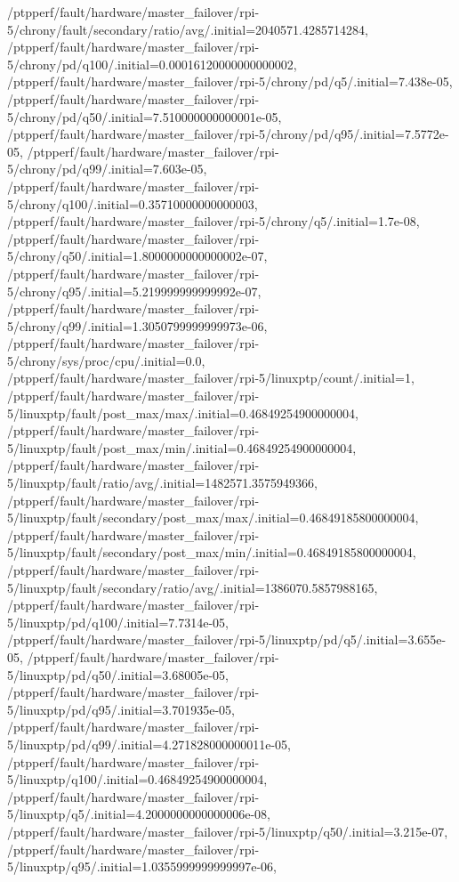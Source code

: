 {    /ptpperf/fault/hardware/master_failover/rpi-5/chrony/fault/secondary/ratio/avg/.initial=2040571.4285714284,
    /ptpperf/fault/hardware/master_failover/rpi-5/chrony/pd/q100/.initial=0.00016120000000000002,
    /ptpperf/fault/hardware/master_failover/rpi-5/chrony/pd/q5/.initial=7.438e-05,
    /ptpperf/fault/hardware/master_failover/rpi-5/chrony/pd/q50/.initial=7.510000000000001e-05,
    /ptpperf/fault/hardware/master_failover/rpi-5/chrony/pd/q95/.initial=7.5772e-05,
    /ptpperf/fault/hardware/master_failover/rpi-5/chrony/pd/q99/.initial=7.603e-05,
    /ptpperf/fault/hardware/master_failover/rpi-5/chrony/q100/.initial=0.35710000000000003,
    /ptpperf/fault/hardware/master_failover/rpi-5/chrony/q5/.initial=1.7e-08,
    /ptpperf/fault/hardware/master_failover/rpi-5/chrony/q50/.initial=1.8000000000000002e-07,
    /ptpperf/fault/hardware/master_failover/rpi-5/chrony/q95/.initial=5.219999999999992e-07,
    /ptpperf/fault/hardware/master_failover/rpi-5/chrony/q99/.initial=1.3050799999999973e-06,
    /ptpperf/fault/hardware/master_failover/rpi-5/chrony/sys/proc/cpu/.initial=0.0,
    /ptpperf/fault/hardware/master_failover/rpi-5/linuxptp/count/.initial=1,
    /ptpperf/fault/hardware/master_failover/rpi-5/linuxptp/fault/post_max/max/.initial=0.46849254900000004,
    /ptpperf/fault/hardware/master_failover/rpi-5/linuxptp/fault/post_max/min/.initial=0.46849254900000004,
    /ptpperf/fault/hardware/master_failover/rpi-5/linuxptp/fault/ratio/avg/.initial=1482571.3575949366,
    /ptpperf/fault/hardware/master_failover/rpi-5/linuxptp/fault/secondary/post_max/max/.initial=0.46849185800000004,
    /ptpperf/fault/hardware/master_failover/rpi-5/linuxptp/fault/secondary/post_max/min/.initial=0.46849185800000004,
    /ptpperf/fault/hardware/master_failover/rpi-5/linuxptp/fault/secondary/ratio/avg/.initial=1386070.5857988165,
    /ptpperf/fault/hardware/master_failover/rpi-5/linuxptp/pd/q100/.initial=7.7314e-05,
    /ptpperf/fault/hardware/master_failover/rpi-5/linuxptp/pd/q5/.initial=3.655e-05,
    /ptpperf/fault/hardware/master_failover/rpi-5/linuxptp/pd/q50/.initial=3.68005e-05,
    /ptpperf/fault/hardware/master_failover/rpi-5/linuxptp/pd/q95/.initial=3.701935e-05,
    /ptpperf/fault/hardware/master_failover/rpi-5/linuxptp/pd/q99/.initial=4.271828000000011e-05,
    /ptpperf/fault/hardware/master_failover/rpi-5/linuxptp/q100/.initial=0.46849254900000004,
    /ptpperf/fault/hardware/master_failover/rpi-5/linuxptp/q5/.initial=4.2000000000000006e-08,
    /ptpperf/fault/hardware/master_failover/rpi-5/linuxptp/q50/.initial=3.215e-07,
    /ptpperf/fault/hardware/master_failover/rpi-5/linuxptp/q95/.initial=1.0355999999999997e-06,
}
